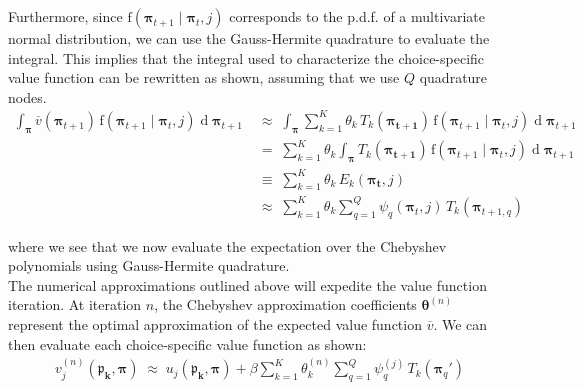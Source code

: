 \documentclass[11pt]{article}
\begin{document}
\noindent Furthermore, since $\text{f}\left( \boldsymbol{\pi}_{t+1} \mid \boldsymbol{\pi}_{t}, j\right)$ corresponds to the p.d.f. of a multivariate normal distribution, we can use the Gauss-Hermite quadrature to evaluate the integral. This implies that the integral used to characterize the choice-specific value function can be rewritten as shown, assuming that we use $Q$ quadrature nodes.
\begin{align*}
\int_{\boldsymbol{\pi}}\overline{v}(\boldsymbol{\pi}_{t+1}) \, \text{f}\left( \boldsymbol{\pi}_{t+1} \mid \boldsymbol{\pi}_{t}, j\right) \operatorname{d}\boldsymbol{\pi}_{t+1} \; & \approx \; \int_{\boldsymbol{\pi}} \sum_{k = 1}^K \theta_k \, T_k(\boldsymbol{\pi_{t+1}})\, \text{f}\left( \boldsymbol{\pi}_{t+1} \mid \boldsymbol{\pi}_{t}, j\right) \operatorname{d}\boldsymbol{\pi}_{t+1} \\
& = \; \sum_{k = 1}^K \theta_k \int_{\boldsymbol{\pi}} T_k(\boldsymbol{\pi_{t+1}})\, \text{f}\left( \boldsymbol{\pi}_{t+1} \mid \boldsymbol{\pi}_{t}, j\right) \operatorname{d}\boldsymbol{\pi}_{t+1}  \\
& \equiv \; \sum_{k = 1}^K \theta_k \,  E_k (\boldsymbol{\pi_t}, j) \\
& \approx \;  \sum_{k = 1}^K \theta_k \sum_{q = 1}^Q  \psi_{q}\left(  \boldsymbol{\pi}_t, j\right) \, T_k (\boldsymbol{\pi}_{t+1, q} )
\end{align*}

\noindent where we see that we now evaluate the expectation over the Chebyshev polynomials using Gauss-Hermite quadrature. \\

\noindent The numerical approximations outlined above will expedite the value function iteration. At iteration $n$, the Chebyshev approximation coefficients $\boldsymbol{\theta}^{(n)}$ represent the optimal approximation of the expected value function $\overline{v}$. We can then evaluate each choice-specific value function as shown:
\begin{align}
	v^{(n)}_j(\mathbf{\boldsymbol{\mathfrak{p}}_k, \boldsymbol{\pi}}) \; \approx \; u_j(\mathbf{\boldsymbol{\mathfrak{p}}_k, \boldsymbol{\pi}}) + \beta \sum_{k = 1}^K \theta_k^{(n)} \sum_{q = 1}^Q  \psi_{q}^{(j)} \, T_k (\boldsymbol{\pi}_{q}') \label{eq:csvf_num}
\end{align}
\end{document}
